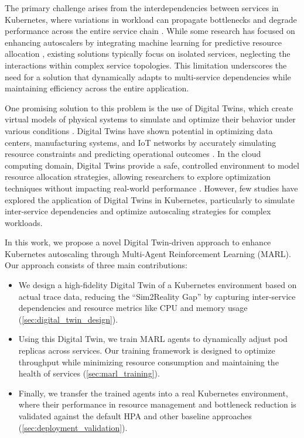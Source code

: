 \documentclass[conference]{IEEEtran}
\begin{document}
The primary challenge arises from the interdependencies between services in Kubernetes, where variations in workload can propagate bottlenecks and degrade performance across the entire service chain \cite{park_predictive_scaling}. While some research has focused on enhancing autoscalers by integrating machine learning for predictive resource allocation \cite{liu_dt_cloud}, existing solutions typically focus on isolated services, neglecting the interactions within complex service topologies. This limitation underscores the need for a solution that dynamically adapts to multi-service dependencies while maintaining efficiency across the entire application.

One promising solution to this problem is the use of Digital Twins, which create virtual models of physical systems to simulate and optimize their behavior under various conditions \cite{schleich_digital_twin}. Digital Twins have shown potential in optimizing data centers, manufacturing systems, and IoT networks by accurately simulating resource constraints and predicting operational outcomes \cite{zhang_marl_k8s}. In the cloud computing domain, Digital Twins provide a safe, controlled environment to model resource allocation strategies, allowing researchers to explore optimization techniques without impacting real-world performance \cite{nguyen_sim2reality}. However, few studies have explored the application of Digital Twins in Kubernetes, particularly to simulate inter-service dependencies and optimize autoscaling strategies for complex workloads.

In this work, we propose a novel Digital Twin-driven approach to enhance Kubernetes autoscaling through Multi-Agent Reinforcement Learning (MARL). Our approach consists of three main contributions:
\begin{itemize}
    \item We design a high-fidelity Digital Twin of a Kubernetes environment based on actual trace data, reducing the ``Sim2Reality Gap'' by capturing inter-service dependencies and resource metrics like CPU and memory usage (\autoref{sec:digital_twin_design}).
    \item Using this Digital Twin, we train MARL agents to dynamically adjust pod replicas across services. Our training framework is designed to optimize throughput while minimizing resource consumption and maintaining the health of services (\autoref{sec:marl_training}).
    \item Finally, we transfer the trained agents into a real Kubernetes environment, where their performance in resource management and bottleneck reduction is validated against the default HPA and other baseline approaches (\autoref{sec:deployment_validation}).
\end{itemize}
\end{document}
